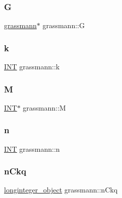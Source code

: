 \mbox{\label{classgrassmann_af23859a453238145856f25be67e6e479}} 
\subsubsection{\texorpdfstring{G}{G}}
{\footnotesize\ttfamily \mbox{\hyperlink{classgrassmann}{grassmann}}$\ast$ grassmann\+::G}

\mbox{\label{classgrassmann_a00e5ae1bd671fb4666379f7b355db11f}} 
\subsubsection{\texorpdfstring{k}{k}}
{\footnotesize\ttfamily \mbox{\hyperlink{galois_8h_a09fddde158a3a20bd2dcadb609de11dc}{I\+NT}} grassmann\+::k}

\mbox{\label{classgrassmann_ab855b34708cd25d313bfb5cc434dbfb0}} 
\subsubsection{\texorpdfstring{M}{M}}
{\footnotesize\ttfamily \mbox{\hyperlink{galois_8h_a09fddde158a3a20bd2dcadb609de11dc}{I\+NT}}$\ast$ grassmann\+::M}

\mbox{\label{classgrassmann_a2559679fc4552f90f84aa3545c7834b0}} 
\subsubsection{\texorpdfstring{n}{n}}
{\footnotesize\ttfamily \mbox{\hyperlink{galois_8h_a09fddde158a3a20bd2dcadb609de11dc}{I\+NT}} grassmann\+::n}

\mbox{\label{classgrassmann_a56323be854e65e59d807524df6a55906}} 
\subsubsection{\texorpdfstring{n\+Ckq}{nCkq}}
{\footnotesize\ttfamily \mbox{\hyperlink{classlonginteger__object}{longinteger\+\_\+object}} grassmann\+::n\+Ckq}

